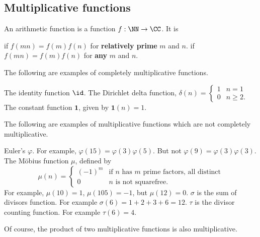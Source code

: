 \documentclass[11pt]{scrartcl}
\begin{document}
\subsection{Multiplicative functions}
\begin{definition}
  An arithmetic function is a function $f : \NN \to \CC$.
  It is
  \begin{itemize}
    \ii {} if $f(mn) = f(m) f(n)$
    for \textbf{relatively prime} $m$ and $n$.
    \ii {} if $f(mn) = f(m)f(n)$
    for \textbf{any} $m$ and $n$.
  \end{itemize}
\end{definition}

\begin{example}
  The following are examples of completely multiplicative functions.
  \begin{itemize}
    \ii The identity function $\id$.
    \ii The Dirichlet delta function, $\delta(n) =
    \begin{cases}
      1 & n = 1 \\
      0 & n \ge 2.
    \end{cases}$
    \ii The constant function $\mathbf 1$,
    given by $\mathbf 1(n) = 1$.
  \end{itemize}
\end{example}

\begin{example}
  The following are examples of multiplicative functions
  which are not completely multiplicative.
  \begin{itemize}
    \ii Euler's $\varphi$. For example, $\varphi(15) = \varphi(3)\varphi(5)$.
    But not $\varphi(9) = \varphi(3)\varphi(3)$.
    \ii The M\"obius function $\mu$, defined by
    \[
      \mu(n)
      =
      \begin{cases}
        (-1)^m & \text{if $n$ has $m$ prime factors, all distinct} \\
        0 & \text{$n$ is not squarefree}.
      \end{cases}
    \]
    For example, $\mu(10) = 1$, $\mu(105) = -1$, but $\mu(12) = 0$.
    \ii $\sigma$ is the sum of divisors function.
    For example $\sigma(6) = 1+2+3+6 = 12$.
    \ii $\tau$ is the divisor counting function.
    For example $\tau(6) = 4$.
  \end{itemize}
\end{example}

Of course, the product of two multiplicative functions is also multiplicative.
\end{document}
